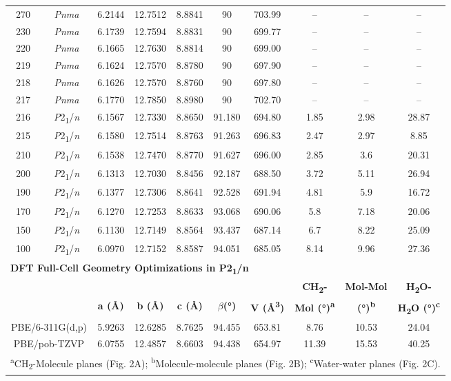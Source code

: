 \begin{table}[ht]
\begin{tabular}{cccccccccc}
    270 & \textit{Pnma}  & 6.2144 & 12.7512 & 8.8841 & 90 & 703.99 & -- & -- & -- \\
    230 & \textit{Pnma}  & 6.1739 & 12.7594 & 8.8831 & 90 & 699.77 & -- & -- & -- \\
    220 & \textit{Pnma}  & 6.1665 & 12.7630 & 8.8814 & 90 & 699.00 & -- & -- & -- \\
    219 & \textit{Pnma}  & 6.1624 & 12.7570 & 8.8780 & 90 & 697.90 & -- & -- & -- \\
    218 & \textit{Pnma}  & 6.1626 & 12.7570 & 8.8760 & 90 & 697.80 & -- & -- & -- \\
    217 & \textit{Pnma}  & 6.1770 & 12.7850 & 8.8980 & 90 & 702.70 & -- & -- & -- \\
    216 & \textit{P}2\textsubscript{1}/\textit{n} & 6.1567 & 12.7330 & 8.8650 & 91.180 & 694.80 & 1.85 & 2.98 & 28.87 \\
    215 & \textit{P}2\textsubscript{1}/\textit{n} & 6.1580 & 12.7514 & 8.8763 & 91.263 & 696.83 & 2.47 & 2.97 & 8.85 \\
    210 & \textit{P}2\textsubscript{1}/\textit{n} & 6.1538 & 12.7470 & 8.8770 & 91.627 & 696.00 & 2.85 & 3.6 & 20.31 \\
    200 & \textit{P}2\textsubscript{1}/\textit{n} & 6.1313 & 12.7030 & 8.8456 & 92.187 & 688.50 & 3.72 & 5.11 & 26.94 \\
    190 & \textit{P}2\textsubscript{1}/\textit{n} & 6.1377 & 12.7306 & 8.8641 & 92.528 & 691.94 & 4.81 & 5.9 & 16.72 \\
    170 & \textit{P}2\textsubscript{1}/\textit{n} & 6.1270 & 12.7253 & 8.8633 & 93.068 & 690.06 & 5.8 & 7.18 & 20.06 \\
    150 & \textit{P}2\textsubscript{1}/\textit{n} & 6.1130 & 12.7149 & 8.8564 & 93.437 & 687.14 & 6.7 & 8.22 & 25.09 \\
    100 & \textit{P}2\textsubscript{1}/\textit{n} & 6.0970 & 12.7152 & 8.8587 & 94.051 & 685.05 & 8.14 & 9.96 & 27.36 \\
    \hline
    \multicolumn{10}{l}{\textbf{DFT Full-Cell Geometry Optimizations in P2\textsubscript{1}/n}} \\
    & & & & & & & \textbf{CH\textsubscript{2}-} & \textbf{Mol-Mol} & \textbf{H\textsubscript{2}O-}\\
     \multicolumn{2}{c}{} &	\textbf{a (Å)} & \textbf{b (Å)} & \textbf{c (Å)} & \textbf{\(\beta\)(°)} & \textbf{V (Å\textsuperscript{3})} & \textbf{Mol (°)\textsuperscript{a}} & \textbf{(°)\textsuperscript{b}} &	\textbf{H\textsubscript{2}O (°)\textsuperscript{c}} \\
    \multicolumn{2}{c}{PBE/6-311G(d,p)} & 5.9263 & 12.6285 & 8.7625 & 94.455 & 653.81 & 8.76 & 10.53 & 24.04 \\
    \multicolumn{2}{c}{PBE/pob-TZVP} & 6.0755 & 12.4857 & 8.6603 & 94.438 & 654.97 & 11.39 & 15.53 & 40.25 \\
    \hline
    \multicolumn{10}{l}{\textsuperscript{a}CH\textsubscript{2}-Molecule planes (Fig. 2A); \textsuperscript{b}Molecule-molecule planes (Fig. 2B); \textsuperscript{c}Water-water planes (Fig. 2C).}
    \label{btadh_latticeparams}
    \end{tabular}
    \end{table}


